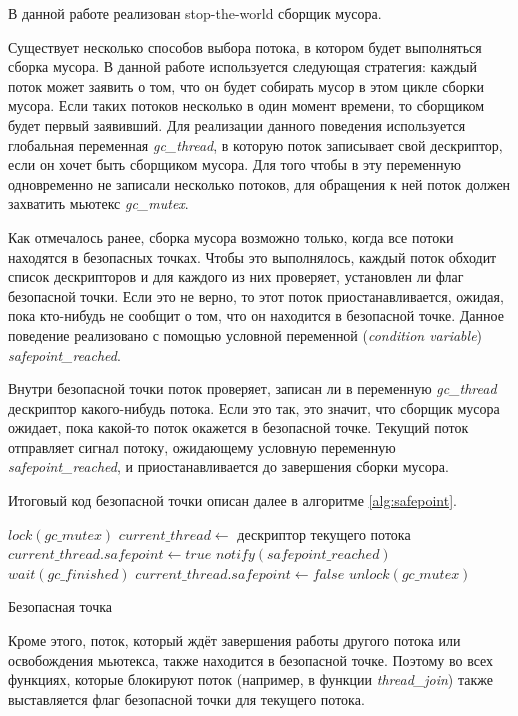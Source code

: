 В данной работе реализован stop-the-world сборщик мусора.

Существует несколько способов выбора потока, в котором будет выполняться сборка мусора. В данной работе используется следующая стратегия: каждый поток может заявить о том, что он будет собирать мусор в этом цикле сборки мусора. Если таких потоков несколько в один момент времени, то сборщиком будет первый заявивший. Для реализации данного поведения используется глобальная переменная \textit{gc\_thread}, в которую поток записывает свой дескриптор, если он хочет быть сборщиком  мусора. Для того чтобы в эту переменную одновременно не записали несколько потоков, для обращения к ней поток должен захватить мьютекс \textit{gc\_mutex}. 

Как отмечалось ранее, сборка мусора возможно только, когда все потоки находятся в безопасных точках. Чтобы это выполнялось, каждый поток обходит список дескрипторов и для каждого из них проверяет, установлен ли флаг безопасной точки. Если это не верно, то этот поток приостанавливается, ожидая, пока кто-нибудь не сообщит о том, что он находится в безопасной точке. Данное поведение реализовано с помощью условной переменной (\textit{condition variable}) \textit{safepoint\_reached}.

Внутри безопасной точки поток проверяет, записан ли в переменную \textit{gc\_thread} дескриптор какого-нибудь потока. Если это так, это значит, что сборщик мусора ожидает, пока какой-то поток окажется в безопасной точке. Текущий поток отправляет сигнал потоку, ожидающему условную переменную \textit{safepoint\_reached}, и приостанавливается до завершения сборки мусора. 

Итоговый код безопасной точки описан далее в алгоритме \ref{alg:safepoint}.

\begin{algorithm}[h]
\begin{algorithmic}[1]
\State $lock(gc\_mutex)$
\State $current\_thread \gets$ дескриптор текущего потока
\State $current\_thread.safepoint \gets true$
    \State $notify(safepoint\_reached)$
    \State $wait(gc\_finished)$
\EndIf
\State $current\_thread.safepoint \gets false$
\State $unlock(gc\_mutex)$
\end{algorithmic}
\caption{Безопасная точка}\label{alg:safepoint}
\end{algorithm}

Кроме этого, поток, который ждёт завершения работы другого потока или освобождения мьютекса, также находится в безопасной точке. Поэтому во всех функциях, которые блокируют поток (например, в функции \textit{thread\_join}) также выставляется флаг безопасной точки для текущего потока.

